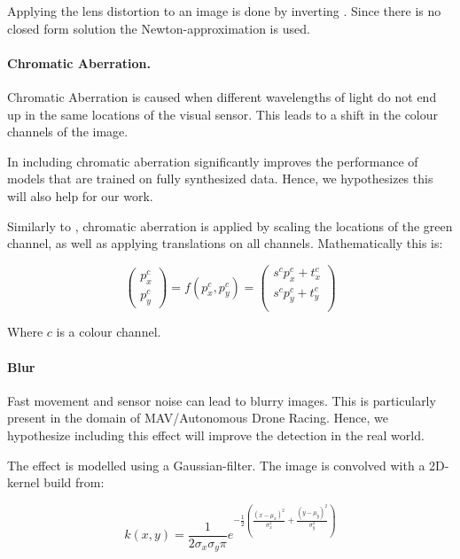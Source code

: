 Applying the lens distortion to an image is done by inverting . Since there is no closed form solution the Newton-approximation is used.


\paragraph{Chromatic Aberration.}

Chromatic Aberration is caused when different wavelengths of light do not end up in the same locations of the visual sensor. This leads to a shift in the colour channels of the image.

In \cite{Carlson2018} including chromatic aberration significantly improves the performance of models that are trained on fully synthesized data. Hence, we hypothesizes this will also help for our work.

Similarly to \cite{Carlson2018}, chromatic aberration is applied by scaling the locations of the green channel, as well as applying translations on all channels. Mathematically this is:

\begin{equation}
\begin{pmatrix}
p_x^c \\
p_y^c  
\end{pmatrix}= f(p_x^c,p_y^c) = \begin{pmatrix}
s^c p_x^c + t_x^c \\
s^c p_y^c + t_y^c \\
\end{pmatrix} 
\end{equation}

Where $c$ is a colour channel.

\paragraph{Blur}

Fast movement and sensor noise can lead to blurry images. This is particularly present in the domain of \ac{MAV}/Autonomous Drone Racing. Hence, we hypothesize including this effect will improve the detection in the real world. 

The effect is modelled using a Gaussian-filter. The image is convolved with a 2D-kernel build from:

\begin{equation}
k(x,y) = \frac{1}{2\sigma_x\sigma_y\pi}e^{-\frac{1}{2}({\frac{(x-\mu_x)^2}{\sigma_x^2} + \frac{(y-\mu_y)^2}{\sigma_y^2}})}
\end{equation}

